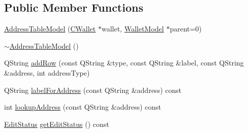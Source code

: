 \subsection*{Public Member Functions}
\begin{DoxyCompactItemize}
\item 
\hyperlink{class_address_table_model_a273787011f7e387cc68b8282539fb9ef}{Address\+Table\+Model} (\hyperlink{class_c_wallet}{C\+Wallet} $\ast$wallet, \hyperlink{class_wallet_model}{Wallet\+Model} $\ast$parent=0)
\item 
\hyperlink{class_address_table_model_a1684bd5318c019064a28eb36efd11ea6}{$\sim$\+Address\+Table\+Model} ()
\item 
Q\+String \hyperlink{class_address_table_model_a08ab9ae401a18d193f0e39551de81280}{add\+Row} (const Q\+String \&type, const Q\+String \&label, const Q\+String \&address, int address\+Type)
\item 
Q\+String \hyperlink{class_address_table_model_a1c39ce19eecfc9f3ace10435b162607f}{label\+For\+Address} (const Q\+String \&address) const 
\item 
int \hyperlink{class_address_table_model_a49a260d5e629286f6277a2dbc0aaeaaa}{lookup\+Address} (const Q\+String \&address) const 
\item 
\hyperlink{class_address_table_model_a3d502b85fc09461e779dae4589c29956}{Edit\+Status} \hyperlink{class_address_table_model_a4bd9d9835681e87c320f486eeae42968}{get\+Edit\+Status} () const 
\end{DoxyCompactItemize}
